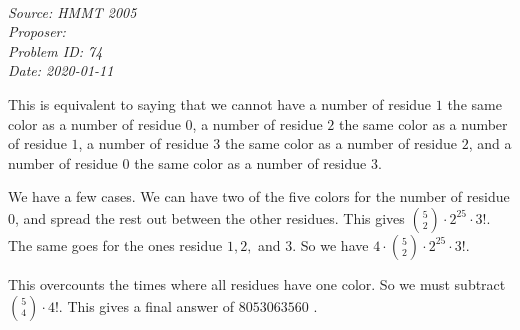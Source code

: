\SSbreak\\
\emph{Source: HMMT 2005}\\
\emph{Proposer: \Ppi}\\
\emph{Problem ID: 74}\\
\emph{Date: 2020-01-11}\\
\SSbreak

\bigskip

\begin{solution}\hfil\medskip
 
  This is equivalent to saying that we cannot have a number of residue $1$ the same color as a number of residue $0$, a number of residue $2$ the same color as a number of residue $1$, a number of residue $3$ the same color as a number of residue $2$, and a number of residue $0$ the same color as a number of residue $3$. 

We have a few cases. We can have two of the five colors for the number of residue $0$, and spread the rest out between the other residues. This gives $\binom{5}{2} \cdot 2^{25} \cdot 3!$. The same goes for the ones residue $1,2,$ and $3$. So we have $4 \cdot \binom{5}{2} \cdot 2^{25} \cdot 3!$.

This overcounts the times where all residues have one color. So we must subtract $\binom{5}{4} \cdot 4!$. This gives a final answer of $\boxed{8053063560}$ .

\end{solution}\bigskip
